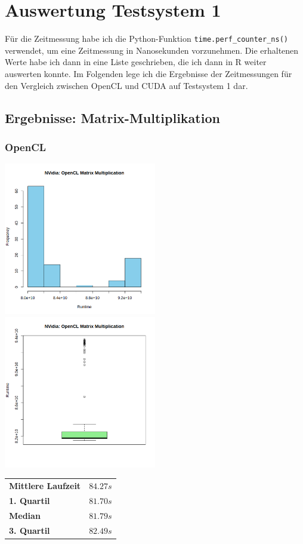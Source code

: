 \documentclass[12pt]{article}
\begin{document}
	\section*{Auswertung Testsystem 1}
	Für die Zeitmessung habe ich die Python-Funktion \texttt{time.perf\_counter\_ns()} verwendet, um eine Zeitmessung in Nanosekunden vorzunehmen.
	Die erhaltenen Werte habe ich dann in eine Liste geschrieben, die ich dann in R weiter auswerten konnte.
	Im Folgenden lege ich die Ergebnisse der Zeitmessungen für den Vergleich zwischen OpenCL und CUDA auf Testsystem 1 dar.
	
	\subsection*{Ergebnisse: Matrix-Multiplikation}
	\subsubsection*{OpenCL}
	\includegraphics[width=0.5\textwidth]{../statistics/nvidia/opencl/histogram_matmul.png}
	\includegraphics[width=0.5\textwidth]{../statistics/nvidia/opencl/boxplot_matmul.png}
	\\
	\begin{center}
		\begin{tabular}{|l|l|}
		\toprule
		\textbf{Mittlere Laufzeit} 		& $84.27s$ \\
		\textbf{1. Quartil}				& $81.70s$ \\
		\textbf{Median}					& $81.79s$  \\
		\textbf{3. Quartil}				& $82.49s$  \\
		\bottomrule
		\end{tabular}
	\end{center}
	
\end{document}
